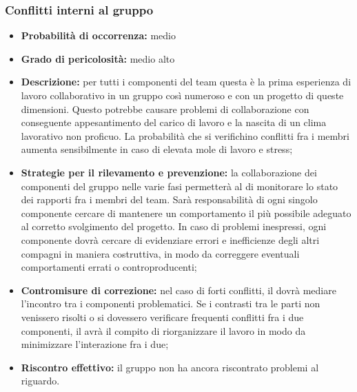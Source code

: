 \subsubsection{Conflitti interni al gruppo}
\hypertarget{subsubsect:conflitti}{}
\begin{itemize}
\item \textbf{Probabilità di occorrenza:} medio
\item \textbf{Grado di pericolosità:} medio alto

\item \textbf{Descrizione:} per tutti i componenti del team questa è la prima esperienza di lavoro collaborativo in un gruppo così numeroso e con un progetto di queste dimensioni. Questo potrebbe causare problemi di collaborazione con conseguente appesantimento del carico di lavoro e la nascita di un clima lavorativo non proficuo. La probabilità che si verifichino conflitti fra i membri aumenta sensibilmente in caso di elevata mole di lavoro e stress;

\item \textbf{Strategie per il rilevamento e prevenzione:} la collaborazione dei componenti del gruppo nelle varie fasi permetterà al \ruoloResponsabile{} di monitorare lo stato dei rapporti fra i membri del team. Sarà responsabilità di ogni singolo componente cercare di mantenere un comportamento il più possibile adeguato al corretto svolgimento del progetto. In caso di problemi inespressi, ogni componente dovrà cercare di evidenziare errori e inefficienze degli altri compagni in maniera costruttiva, in modo da correggere eventuali comportamenti errati o controproducenti;

\item \textbf{Contromisure di correzione:} nel caso di forti conflitti, il \ruoloResponsabile{} dovrà mediare l'incontro tra i componenti problematici. Se i contrasti tra le parti non venissero risolti o si dovessero verificare frequenti conflitti fra i due componenti, il \ruoloResponsabile{} avrà il compito di riorganizzare il lavoro in modo da minimizzare l'interazione fra i due;

\item \textbf{Riscontro effettivo:} il gruppo non ha ancora riscontrato problemi al riguardo.
\end{itemize}

